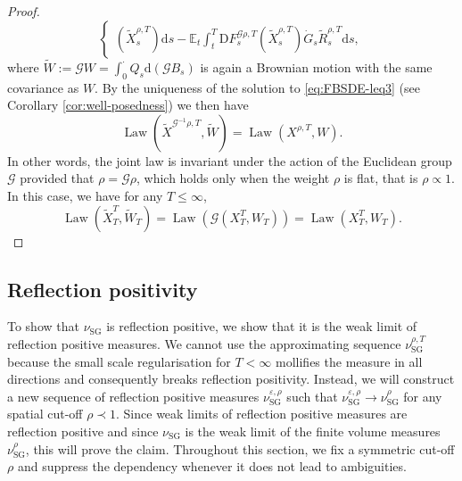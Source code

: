 \documentclass[11pt, a4paper]{scrartcl}
\numberwithin{equation}{section}
\theoremstyle{plain}
\theoremstyle{remark}
\newcommand{\assign}{:=}
\newcommand{\mathD}{\mathrm{D}}
\newcommand{\mathd}{\mathrm{d}}
\newcommand{\tmop}[1]{\ensuremath{\operatorname{#1}}}
\begin{document}
\begin{proof}
\[\begin{cases}
       (\tilde{X}_s^{\rho, T}) \mathd s -\mathbb{E}_t  \int_t^T \mathD
       F^{\mathcal{G} \rho, T}_s (\tilde{X}_s^{\rho, T})  \dot{G}_s 
       \tilde{R}_s^{\rho, T} \mathd s,
     \end{cases} \]
  where $\tilde{W} \assign \mathcal{G} W = \int_0^{\cdot} Q_s \mathd
  (\mathcal{G} B_s)$ is again a Brownian motion with the same covariance as
  $W$. By the uniqueness of the solution to \eqref{eq:FBSDE-leq3} (see
  Corollary \ref{cor:well-posedness}) we then have
  \[ \tmop{Law} (\tilde{X}^{\mathcal{G}^{- 1} \rho, T}, \tilde{W}) =
     \tmop{Law} (X^{\rho, T}, W) . \]
  In other words, the joint law is invariant under the action of the Euclidean
  group $\mathcal{G}$ provided that $\rho = \mathcal{G} \rho$, which holds
  only when the weight $\rho$ is flat, that is $\rho \propto 1$. In this case,
  we have for any $T \leqslant \infty$,
  \[ \tmop{Law} (\tilde{X}^T_T, \tilde{W}_T) = \tmop{Law} (\mathcal{G} (X^T_T,
     W_T)) = \tmop{Law} (X^T_T, W_T) . \]
\end{proof}

\subsection{Reflection positivity}\label{sec:RP}

To show that $\nu_{\tmop{SG}}$ is reflection positive, we show that it is the
weak limit of reflection positive measures. We cannot use the approximating
sequence $\nu^{\rho, T}_{\tmop{SG}}$because the small scale regularisation for
$T < \infty$ mollifies the measure in all directions and consequently breaks
reflection positivity. Instead, we will construct a new sequence of reflection
positive measures $\nu_{\tmop{SG}}^{\varepsilon, \rho}$ such that
$\nu_{\tmop{SG}}^{\varepsilon, \rho} \rightarrow \nu_{\tmop{SG}}^{\rho}$ for
any spatial cut-off $\rho \prec 1$. Since weak limits of reflection positive
measures are reflection positive and since $\nu_{\tmop{SG}}$ is the weak limit
of the finite volume measures $\nu_{\tmop{SG}}^{\rho}$, this will prove the
claim. Throughout this section, we fix a symmetric cut-off $\rho$ and suppress
the dependency whenever it does not lead to ambiguities.
\end{document}
